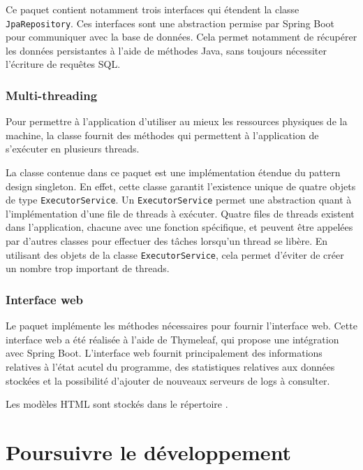 \documentclass{article}
\begin{document}
Ce paquet contient notamment trois interfaces qui étendent la classe \texttt{JpaRepository}.  Ces interfaces sont une abstraction permise par Spring Boot pour communiquer avec la base de données.  Cela permet notamment de récupérer les données persistantes à l'aide de méthodes Java, sans toujours nécessiter l'écriture de requêtes SQL.


\subsubsection{Multi-threading}

Pour permettre à l'application d'utiliser au mieux les ressources physiques de la machine, la classe  fournit des méthodes qui permettent à l'application de s'exécuter en plusieurs threads.

La classe contenue dans ce paquet est une implémentation étendue du pattern design singleton.  En effet, cette classe garantit l'existence unique de quatre objets de type \texttt{ExecutorService}.  Un \texttt{ExecutorService} permet une abstraction quant à l'implémentation d'une file de threads à exécuter.  Quatre files de threads existent dans l'application, chacune avec une fonction spécifique, et peuvent être appelées par d'autres classes pour effectuer des tâches lorsqu'un thread se libère.  En utilisant des objets de la classe \texttt{ExecutorService}, cela permet d'éviter de créer un nombre trop important de threads.


\subsubsection{Interface web}

Le paquet  implémente les méthodes nécessaires pour fournir l'interface web.  Cette interface web a été réalisée à l'aide de Thymeleaf, qui propose une intégration avec Spring Boot.  L'interface  web fournit principalement des informations relatives à l'état acutel du programme, des statistiques relatives aux données stockées et la possibilité d'ajouter de nouveaux serveurs de logs à consulter.

Les modèles HTML sont stockés dans le répertoire .


\section{Poursuivre le développement}
\end{document}
